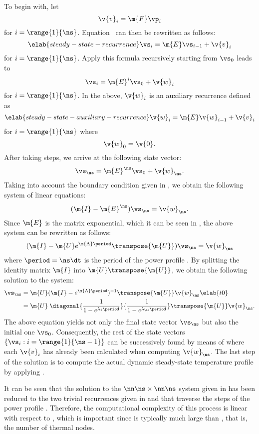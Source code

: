 To begin with, let
\[
  \v{v}_i = \m{F} \vp_i
\]
for $i = \range{1}{\ns}$. Equation~ can then be
rewritten as follows:
\begin{equation} \elab{steady-state-recurrence}
  \vs_i = \m{E} \vs_{i - 1} + \v{v}_i
\end{equation}
for $i = \range{1}{\ns}$. Apply this formula recursively starting from $\vs_0$
leads to
\[
  \vs_i = \m{E}^i \vs_0 + \v{w}_i
\]
for $i = \range{1}{\ns}$. In the above, $\v{w}_i$ is an auxiliary recurrence
defined as
\begin{equation} \elab{steady-state-auxiliary-recurrence}
  \v{w}_i = \m{E} \v{w}_{i - 1} + \v{v}_i
\end{equation}
for $i = \range{1}{\ns}$ where
\[
  \v{w}_0 = \v{0}.
\]
After taking \ns steps, we arrive at the following state vector:
\[
  \vs_\ns = \m{E}^\ns \vs_0 + \v{w}_\ns.
\]
Taking into account the boundary condition given in ,
we obtain the following system of linear equations:
\[
  (\m{I} - \m{E}^\ns) \vs_\ns = \v{w}_\ns.
\]
Since $\m{E}$ is the matrix exponential, which it can be seen in
, the above system can be rewritten as follows:
\[
  (\m{I} - \m{U} e^{\m{\Lambda} \period} \transpose{\m{U}}) \vs_\ns = \v{w}_\ns
\]
where $\period = \ns \dt$ is the period of the power profile \mp. By splitting
the identity matrix $\m{I}$ into $\m{U} \transpose{\m{U}}$, we obtain the
following solution to the system:
\begin{align}
  \vs_\ns
  & = \m{U} (\m{I} - e^{\m{\Lambda} \period})^{-1} \transpose{\m{U}} \v{w}_\ns \elab{t0} \\
  & = \m{U} \: \diagonal{\frac{1}{1 - e^{\lambda_1 \period}}}{\frac{1}{1 - e^{\lambda_\ns \period}}} \transpose{\m{U}} \v{w}_\ns. \nonumber
\end{align}
The above equation yields not only the final state vector $\vs_\ns$ but also the
initial one $\vs_0$. Consequently, the rest of the state vectors $\{ \vs_i: i =
\range{1}{\ns - 1} \}$ can be successively found by means of
 where each $\v{v}_i$ has already been calculated
when computing $\v{w}_\ns$. The last step of the solution is to compute the
actual dynamic steady-state temperature profile \mq by applying
.

It can be seen that the solution to the $\nn \ns \times \nn \ns$ system given in
 has been reduced to the two trivial recurrences given
in  and 
that traverse the \ns steps of the power profile \mp. Therefore, the
computational complexity of this process is linear with respect to \ns, which is
important since \ns is typically much large than \nn, that is, the number of
thermal nodes.


